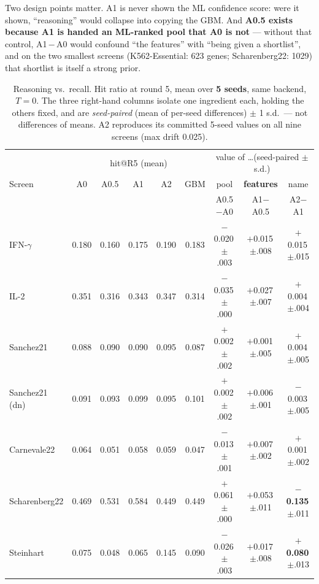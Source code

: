 \documentclass[11pt]{article}
\begin{document}
\noindent
Two design points matter. A1 is never shown the ML confidence score: were it shown, ``reasoning''
would collapse into copying the GBM. And \textbf{A0.5 exists because A1 is handed an ML-ranked pool
that A0 is not} --- without that control, A1\,$-$\,A0 would confound ``the features'' with ``being
given a shortlist'', and on the two smallest screens (K562-Essential: 623 genes; Scharenberg22: 1029)
that shortlist is itself a strong prior.

\begin{table}[H]
\centering
\caption{Reasoning vs.\ recall. Hit ratio at round 5, mean over \textbf{5 seeds}, same backend, $T=0$.
The three right-hand columns isolate one ingredient each, holding the others fixed, and are
\emph{seed-paired} (mean of per-seed differences) $\pm$ 1 s.d.\ --- not differences of means.
A2 reproduces its committed 5-seed values on all nine screens (max drift 0.025).}
\label{tab:reasoning}
\footnotesize
\setlength{\tabcolsep}{3pt}
\begin{tabular}{lccccc|ccc}
\toprule
 & \multicolumn{5}{c|}{hit@R5 (mean)} & \multicolumn{3}{c}{value of \ldots (seed-paired $\pm$s.d.)} \\
Screen & A0 & A0.5 & A1 & A2 & GBM & pool & \textbf{features} & name \\
 &  &  &  &  &  & \tiny A0.5$-$A0 & \tiny A1$-$A0.5 & \tiny A2$-$A1 \\
\midrule
IFN-$\gamma$   & 0.180 & 0.160 & 0.175 & 0.190 & 0.183 & $-$0.020\,{\tiny$\pm$.003} & $+$0.015\,{\tiny$\pm$.008} & $+$0.015\,{\tiny$\pm$.015} \\
IL-2           & 0.351 & 0.316 & 0.343 & 0.347 & 0.314 & $-$0.035\,{\tiny$\pm$.000} & $+$0.027\,{\tiny$\pm$.007} & $+$0.004\,{\tiny$\pm$.004} \\
Sanchez21      & 0.088 & 0.090 & 0.090 & 0.095 & 0.087 & $+$0.002\,{\tiny$\pm$.002} & $+$0.001\,{\tiny$\pm$.005} & $+$0.004\,{\tiny$\pm$.005} \\
Sanchez21 (dn) & 0.091 & 0.093 & 0.099 & 0.095 & 0.101 & $+$0.002\,{\tiny$\pm$.002} & $+$0.006\,{\tiny$\pm$.001} & $-$0.003\,{\tiny$\pm$.005} \\
Carnevale22    & 0.064 & 0.051 & 0.058 & 0.059 & 0.047 & $-$0.013\,{\tiny$\pm$.001} & $+$0.007\,{\tiny$\pm$.002} & $+$0.001\,{\tiny$\pm$.002} \\
Scharenberg22  & 0.469 & 0.531 & 0.584 & 0.449 & 0.449 & $+$0.061\,{\tiny$\pm$.000} & $+$0.053\,{\tiny$\pm$.011} & \textbf{$-$0.135}\,{\tiny$\pm$.011} \\
Steinhart      & 0.075 & 0.048 & 0.065 & 0.145 & 0.090 & $-$0.026\,{\tiny$\pm$.003} & $+$0.017\,{\tiny$\pm$.008} & \textbf{$+$0.080}\,{\tiny$\pm$.013} \\

\end{tabular}
\end{table}
\end{document}
